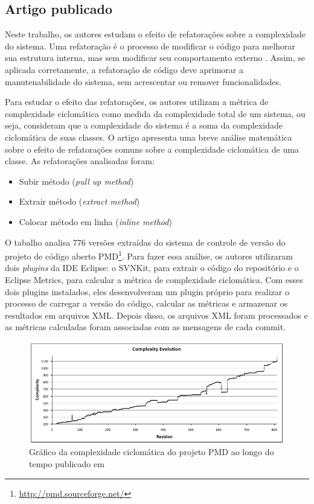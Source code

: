 \documentclass[a4paper, 12pt, twoside]{book}
\begin{document}
        \subsection*{Artigo publicado}

        Neste trabalho, os autores estudam o efeito de refatorações sobre a complexidade do sistema. Uma refatoração é o processo de modificar o código para melhorar sua estrutura interna, mas sem modificar seu comportamento externo \cite{fowler-refactoring}. Assim, se aplicada corretamente, a refatoração de código deve aprimorar a manutenabilidade do sistema, sem acrescentar ou remover funcionalidades.

        Para estudar o efeito das refatorações, os autores utilizam a métrica de complexidade ciclomática como medida da complexidade total de um sistema, ou seja, consideram que a complexidade do sistema é a soma da complexidade ciclomática de suas classes. O artigo apresenta uma breve análise matemática sobre o efeito de refatorações comuns sobre a complexidade ciclomática de uma classe. As refatorações analisadas foram:

        \begin{itemize}
            \item Subir método (\textit{pull up method})
            \item Extrair método (\textit{extract method})
            \item Colocar método em linha (\textit{inline method})
        \end{itemize}

        O tabalho analisa 776 versões extraídas do sistema de controle de versão do projeto de código aberto PMD\footnote{\url{http://pmd.sourceforge.net/}}. Para fazer essa análise, os autores utilizaram dois \textit{plugins} da IDE Eclipse: o SVNKit, para extrair o código do repositório e o Eclipse Metrics, para calcular a métrica de complexidade ciclomática. Com esses dois plugins instalados, eles desenvolveram um plugin próprio para realizar o processo de carregar a versão do código, calcular as métricas e armazenar os resultados em arquivos XML. Depois disso, os arquivos XML foram processados e as métricas calculadas foram associadas com as mensagens de cada commit.

        \begin{figure}[ht]
            \centering
            \includegraphics[width=1.0\textwidth]{img/cc-soetens.png}
            \caption{Gráfico da complexidade ciclomática do projeto PMD ao longo do tempo publicado em \cite{SoetensQUATIC2010}}
            \label{fig:evolucao-soetens}
        \end{figure}
\end{document}
